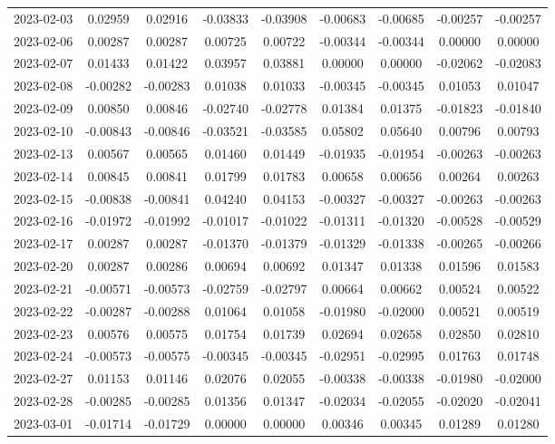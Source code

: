 \begin{footnotesize}
\begin{longtable}{lcccccccc}
2023-02-03 & 0.02959 & 0.02916 & -0.03833 & -0.03908 & -0.00683 & -0.00685 & -0.00257 & -0.00257 \\
2023-02-06 & 0.00287 & 0.00287 & 0.00725 & 0.00722 & -0.00344 & -0.00344 & 0.00000 & 0.00000 \\
2023-02-07 & 0.01433 & 0.01422 & 0.03957 & 0.03881 & 0.00000 & 0.00000 & -0.02062 & -0.02083 \\
2023-02-08 & -0.00282 & -0.00283 & 0.01038 & 0.01033 & -0.00345 & -0.00345 & 0.01053 & 0.01047 \\
2023-02-09 & 0.00850 & 0.00846 & -0.02740 & -0.02778 & 0.01384 & 0.01375 & -0.01823 & -0.01840 \\
2023-02-10 & -0.00843 & -0.00846 & -0.03521 & -0.03585 & 0.05802 & 0.05640 & 0.00796 & 0.00793 \\
2023-02-13 & 0.00567 & 0.00565 & 0.01460 & 0.01449 & -0.01935 & -0.01954 & -0.00263 & -0.00263 \\
2023-02-14 & 0.00845 & 0.00841 & 0.01799 & 0.01783 & 0.00658 & 0.00656 & 0.00264 & 0.00263 \\
2023-02-15 & -0.00838 & -0.00841 & 0.04240 & 0.04153 & -0.00327 & -0.00327 & -0.00263 & -0.00263 \\
2023-02-16 & -0.01972 & -0.01992 & -0.01017 & -0.01022 & -0.01311 & -0.01320 & -0.00528 & -0.00529 \\
2023-02-17 & 0.00287 & 0.00287 & -0.01370 & -0.01379 & -0.01329 & -0.01338 & -0.00265 & -0.00266 \\
2023-02-20 & 0.00287 & 0.00286 & 0.00694 & 0.00692 & 0.01347 & 0.01338 & 0.01596 & 0.01583 \\
2023-02-21 & -0.00571 & -0.00573 & -0.02759 & -0.02797 & 0.00664 & 0.00662 & 0.00524 & 0.00522 \\
2023-02-22 & -0.00287 & -0.00288 & 0.01064 & 0.01058 & -0.01980 & -0.02000 & 0.00521 & 0.00519 \\
2023-02-23 & 0.00576 & 0.00575 & 0.01754 & 0.01739 & 0.02694 & 0.02658 & 0.02850 & 0.02810 \\
2023-02-24 & -0.00573 & -0.00575 & -0.00345 & -0.00345 & -0.02951 & -0.02995 & 0.01763 & 0.01748 \\
2023-02-27 & 0.01153 & 0.01146 & 0.02076 & 0.02055 & -0.00338 & -0.00338 & -0.01980 & -0.02000 \\
2023-02-28 & -0.00285 & -0.00285 & 0.01356 & 0.01347 & -0.02034 & -0.02055 & -0.02020 & -0.02041 \\
2023-03-01 & -0.01714 & -0.01729 & 0.00000 & 0.00000 & 0.00346 & 0.00345 & 0.01289 & 0.01280 \\

\end{longtable}
\end{footnotesize}
